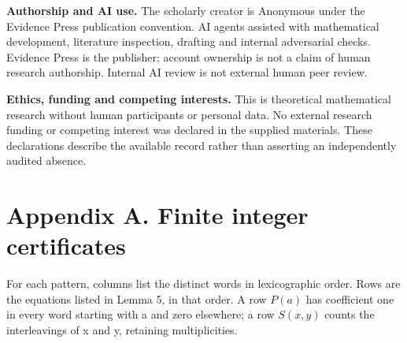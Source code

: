 \documentclass[
  11pt,
  a4paper,
]{scrartcl}
\begin{document}
\textbf{Authorship and AI use.} The scholarly creator is Anonymous under
the Evidence Press publication convention. AI agents assisted with
mathematical development, literature inspection, drafting and internal
adversarial checks. Evidence Press is the publisher; account ownership
is not a claim of human research authorship. Internal AI review is not
external human peer review.

\textbf{Ethics, funding and competing interests.} This is theoretical
mathematical research without human participants or personal data. No
external research funding or competing interest was declared in the
supplied materials. These declarations describe the available record
rather than asserting an independently audited absence.

\section{Appendix A. Finite integer
certificates}\label{appendix-a.-finite-integer-certificates}

For each pattern, columns list the distinct words in lexicographic
order. Rows are the equations listed in Lemma 5, in that order. A row
\(P(a)\) has coefficient one in every word starting with a and zero
elsewhere; a row \(S(x,y)\) counts the interleavings of x and y,
retaining multiplicities.
\end{document}
